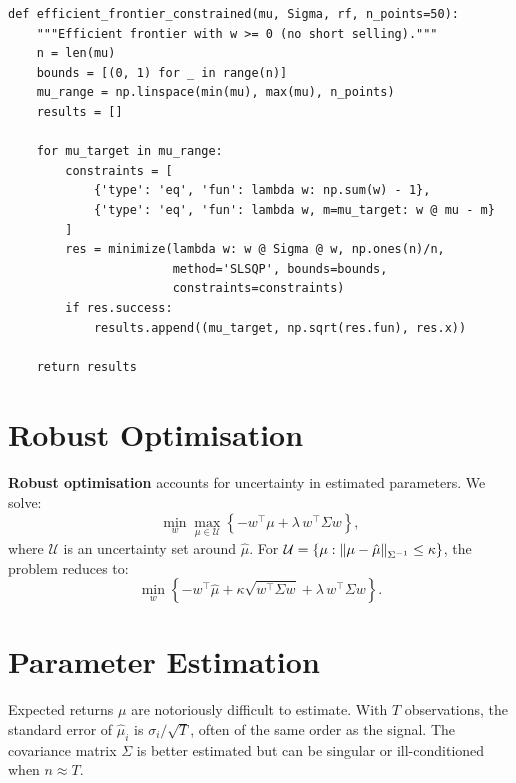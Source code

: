 \begin{codeblock}[title=\textbf{Optimisation with Constraints}]
\begin{verbatim}
def efficient_frontier_constrained(mu, Sigma, rf, n_points=50):
    """Efficient frontier with w >= 0 (no short selling)."""
    n = len(mu)
    bounds = [(0, 1) for _ in range(n)]
    mu_range = np.linspace(min(mu), max(mu), n_points)
    results = []

    for mu_target in mu_range:
        constraints = [
            {'type': 'eq', 'fun': lambda w: np.sum(w) - 1},
            {'type': 'eq', 'fun': lambda w, m=mu_target: w @ mu - m}
        ]
        res = minimize(lambda w: w @ Sigma @ w, np.ones(n)/n,
                       method='SLSQP', bounds=bounds,
                       constraints=constraints)
        if res.success:
            results.append((mu_target, np.sqrt(res.fun), res.x))

    return results
\end{verbatim}
\end{codeblock}

\section{Robust Optimisation}

\begin{definition}
\textbf{Robust optimisation} accounts for uncertainty in estimated
parameters. We solve:
\[
    \min_w \max_{\mu \in \mathcal{U}} \left\{-w^\top\mu
    + \lambda\,w^\top\Sigma w\right\},
\]
where $\mathcal{U}$ is an uncertainty set around $\hat{\mu}$.
For $\mathcal{U} = \{\mu : \left\| \mu - \hat{\mu} \right\|_{\Sigma^{-1}} \leq \kappa\}$,
the problem reduces to:
\[
    \min_w \left\{-w^\top\hat{\mu} + \kappa\sqrt{w^\top\Sigma w}
    + \lambda\,w^\top\Sigma w\right\}.
\]
\end{definition}

\section{Parameter Estimation}

\begin{warning}[title=\textbf{Estimation Errors}]
Expected returns $\mu$ are notoriously difficult to estimate. With $T$
observations, the standard error of $\hat{\mu}_i$ is $\sigma_i/\sqrt{T}$,
often of the same order as the signal. The covariance matrix $\Sigma$ is
better estimated but can be singular or ill-conditioned when $n \approx T$.
\end{warning}

